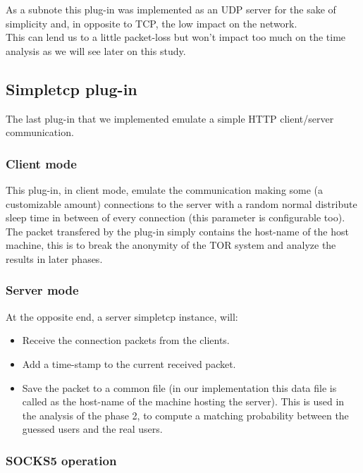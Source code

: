 As a subnote this plug-in was implemented as an UDP server for the sake of
simplicity and, in opposite to TCP, the low impact on the network.\\
This can lend us to a little packet-loss but won't impact too much on the time analysis
as we will see later on this study.

\subsection{Simpletcp plug-in}
The last plug-in that we implemented emulate a simple HTTP client/server communication.
\subsubsection {Client mode}
This plug-in, in client mode, emulate the communication making some (a customizable amount)
connections to the server
with a random normal distribute sleep time in between of every connection
(this parameter is configurable too).\\
The packet transfered by the plug-in simply contains the host-name of the
host machine, this is to break the anonymity of the TOR system and analyze the results
in later phases.\\
\subsubsection {Server mode}
At the opposite end, a server simpletcp instance, will:
\begin{itemize}
	\item Receive the connection packets from the clients.
	\item Add a time-stamp to the current received packet.
	\item Save the packet to a common file (in our implementation this data
	file is called as the host-name of the machine hosting the server).
	This is used in the analysis of the phase 2, to compute a matching probability
	between the guessed users and the real users.
\end{itemize}


\subsubsection {SOCKS5 operation}
